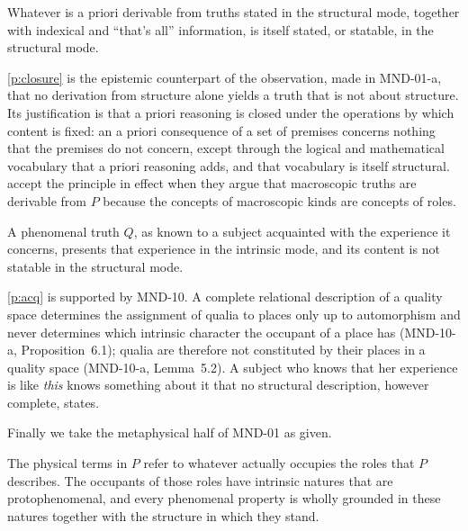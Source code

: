 \documentclass{situationist-preprint}
\begin{document}
\begin{principle}\label{p:closure}
Whatever is a priori derivable from truths stated in the structural mode, together with indexical and \enquote{that's all} information, is itself stated, or statable, in the structural mode.
\end{principle}

\ref{p:closure} is the epistemic counterpart of the observation, made in MND-01-a, that no derivation from structure alone yields a truth that is not about structure. Its justification is that a priori reasoning is closed under the operations by which content is fixed: an a priori consequence of a set of premises concerns nothing that the premises do not concern, except through the logical and mathematical vocabulary that a priori reasoning adds, and that vocabulary is itself structural. \citet{ChalmersJackson2001} accept the principle in effect when they argue that macroscopic truths are derivable from $P$ because the concepts of macroscopic kinds are concepts of roles.

\begin{principle}\label{p:acq}
A phenomenal truth $Q$, as known to a subject acquainted with the experience it concerns, presents that experience in the intrinsic mode, and its content is not statable in the structural mode.
\end{principle}

\ref{p:acq} is supported by MND-10. A complete relational description of a quality space determines the assignment of qualia to places only up to automorphism and never determines which intrinsic character the occupant of a place has (MND-10-a, Proposition~6.1); qualia are therefore not constituted by their places in a quality space (MND-10-a, Lemma~5.2). A subject who knows that her experience is like \emph{this} knows something about it that no structural description, however complete, states.

Finally we take the metaphysical half of MND-01 as given.

\begin{assumption}\label{a:rm}
The physical terms in $P$ refer to whatever actually occupies the roles that $P$ describes. The occupants of those roles have intrinsic natures that are protophenomenal, and every phenomenal property is wholly grounded in these natures together with the structure in which they stand.
\end{assumption}
\end{document}
